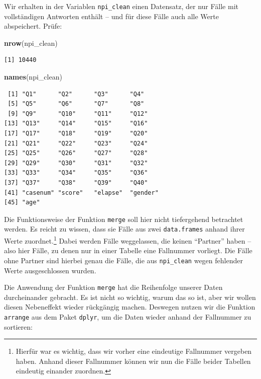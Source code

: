 \documentclass[12pt,]{tufte-book}
\newenvironment{Shaded}{\begin{snugshade}}{\end{snugshade}}
\newcommand{\KeywordTok}[1]{\textcolor[rgb]{0.13,0.29,0.53}{\textbf{#1}}}
\newcommand{\NormalTok}[1]{#1}
\theoremstyle{definition}
\theoremstyle{definition}
\theoremstyle{definition}
\theoremstyle{remark}
\begin{document}
Wir erhalten in der Variablen \texttt{npi\_clean} einen Datensatz, der
nur Fälle mit vollständigen Antworten enthält -- und für diese Fälle
auch alle Werte abspeichert. Prüfe:

\begin{Shaded}
\begin{Highlighting}[]
\KeywordTok{nrow}\NormalTok{(npi_clean)}
\end{Highlighting}
\end{Shaded}

\begin{verbatim}
[1] 10440
\end{verbatim}

\begin{Shaded}
\begin{Highlighting}[]
\KeywordTok{names}\NormalTok{(npi_clean)}
\end{Highlighting}
\end{Shaded}

\begin{verbatim}
 [1] "Q1"      "Q2"      "Q3"      "Q4"     
 [5] "Q5"      "Q6"      "Q7"      "Q8"     
 [9] "Q9"      "Q10"     "Q11"     "Q12"    
[13] "Q13"     "Q14"     "Q15"     "Q16"    
[17] "Q17"     "Q18"     "Q19"     "Q20"    
[21] "Q21"     "Q22"     "Q23"     "Q24"    
[25] "Q25"     "Q26"     "Q27"     "Q28"    
[29] "Q29"     "Q30"     "Q31"     "Q32"    
[33] "Q33"     "Q34"     "Q35"     "Q36"    
[37] "Q37"     "Q38"     "Q39"     "Q40"    
[41] "casenum" "score"   "elapse"  "gender" 
[45] "age"    
\end{verbatim}

Die Funktionsweise der Funktion \texttt{merge} soll hier nicht
tiefergehend betrachtet werden. Es reicht zu wissen, dass sie Fälle aus
zwei \texttt{data.frames} anhand ihrer Werte zuordnet.\footnote{Hierfür
  war es wichtig, dass wir vorher eine eindeutige Fallnummer vergeben
  haben. Anhand dieser Fallnummer können wir nun die Fälle beider
  Tabellen eindeutig einander zuordnen.} Dabei werden Fälle weggelassen,
die keinen ``Partner'' haben -- also hier Fälle, zu denen nur in einer
Tabelle eine Fallnummer vorliegt. Die Fälle ohne Partner sind hierbei
genau die Fälle, die aus \texttt{npi\_clean} wegen fehlender Werte
ausgeschlossen wurden.

Die Anwendung der Funktion \texttt{merge} hat die Reihenfolge unserer
Daten durcheinander gebracht. Es ist nicht so wichtig, warum das so ist,
aber wir wollen diesen Nebeneffekt wieder rückgängig machen. Deswegen
nutzen wir die Funktion \texttt{arrange} aus dem Paket \texttt{dplyr},
um die Daten wieder anhand der Fallnummer zu sortieren:
\end{document}
